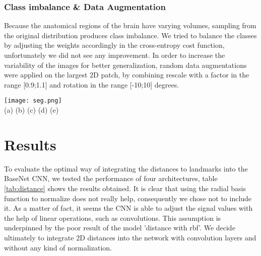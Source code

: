 \documentclass{article}
\begin{document}
\subsubsection{Class imbalance \& Data Augmentation}
Because the anatomical regions of the brain have varying volumes, sampling from the original distribution produces class imbalance. We tried to balance the classes by adjusting the weights accordingly in the cross-entropy cost function, unfortunately we did not see any improvement. \newline
In order to increase the variability of the images for better generalization, random data augmentations were applied on the largest 2D patch, by combining rescale with a factor in the range [0.9;1.1] and rotation in the range [-10;10] degrees.


\begin{figure*}[t!]
    \centering
        \texttt{[image: seg.png]} \\
                (a) \hspace*{30mm} (b) \hspace*{30mm} (c) \hspace*{30mm} (d) \hspace*{30mm} (e)
    \caption{Illustration of the segmentations. Coronal slice (a) and associated segmentation maps : ground truth (b), Full (c), BaseNet+DistBranch (d) and BaseNet (e). The segmentations were obtained on one patient of the test dataset.}
    \label{segmaps}
\end{figure*}

\newpage
\section{Results}
To evaluate the optimal way of integrating the distances to landmarks into the BaseNet CNN, we tested the performance of four architectures, table \ref{tab:distance} shows the results obtained. It is clear that using the radial basis function to normalize does not really help, consequently we chose not to include it. As a matter of fact, it seems the CNN is able to adjust the signal values with the help of linear operations, such as convolutions. This assumption is underpinned by the poor result of the model 'distance with rbf'. We decide ultimately to integrate 2D distances into the network with convolution layers and without any kind of normalization.
\end{document}
